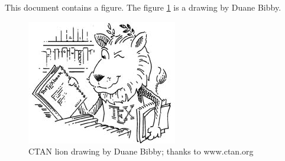 \documentclass{article}
\begin{document}
This document contains a figure. 
The figure \ref{fig:lion} is a drawing by Duane Bibby. 
\begin{figure}
\centering
\label{fig:lion}
\caption[CTAN Lion]{CTAN lion drawing by Duane Bibby; thanks to www.ctan.org}
\includegraphics[scale=0.8, angle=30]{lion_orig.png}
\end{figure}
\end{document}
